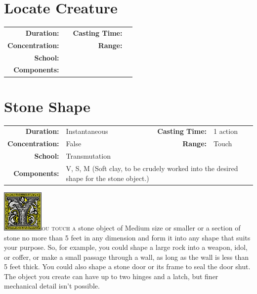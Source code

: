 \documentclass[12pt,showtrims]{memoir}
\begin{document}
\newpage
\section*{Locate Creature}
{
\small\centering\vspace{-6pt}
\begin{tabular}{rlrl}
\toprule

\textbf{Duration:} &  &
\textbf{Casting Time:} &  \\
\textbf{Concentration:} & &
\textbf{Range:} &  \\
\textbf{School:} &  \\
\textbf{Components:} & \multicolumn{3}{p{0.7\textwidth}}{}\\

\bottomrule
\end{tabular}
}
\newpage
\section*{Stone Shape}

{
\small\centering\vspace{-6pt}
\begin{tabular}{rlrl}
\toprule

\textbf{Duration:} & Instantaneous &
\textbf{Casting Time:} & 1 action \\
\textbf{Concentration:} & False &
\textbf{Range:} & Touch \\
\textbf{School:} & Transmutation \\
\textbf{Components:} & \multicolumn{3}{p{0.7\textwidth}}{V, S, M (Soft clay, to be crudely worked into the desired shape for the stone object.)}\\

\bottomrule
\end{tabular}
}

\vspace{1\baselineskip}\noindent 
\lettrine[lines=4]{\includegraphics[height=58pt]{initials/Y.png}}{ou touch a} stone object of Medium size or smaller or a section of stone no more than 5 feet in any dimension and form it into any shape that suits your purpose. So, for example, you could shape a large rock into a weapon, idol, or coffer, or make a small passage through a wall, as long as the wall is less than 5 feet thick. You could also shape a stone door or its frame to seal the door shut. The object you create can have up to two hinges and a latch, but finer mechanical detail isn't possible.
\end{document}
